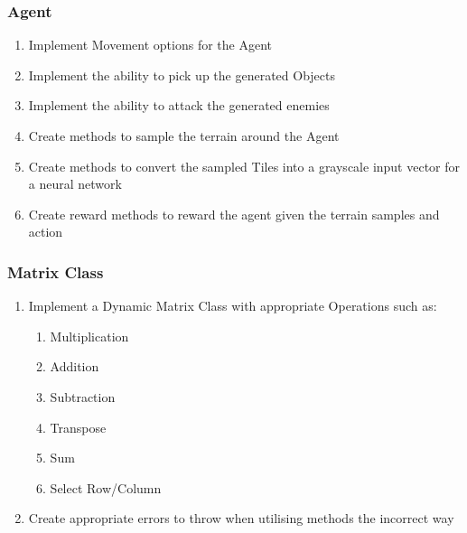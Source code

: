\begin{flushleft}
            \subsubsection*{Agent}
                \begin{enumerate}
                    \item Implement Movement options for the Agent
                    \item Implement the ability to pick up the generated Objects
                    \item Implement the ability to attack the generated enemies
                    \item Create methods to sample the terrain around the Agent
                    \item Create methods to convert the sampled Tiles into a grayscale input vector for a neural network
                    \item Create reward methods to reward the agent given the terrain samples and action
                \end{enumerate}   
            \subsubsection*{Matrix Class}
                \begin{enumerate}
                    \item Implement a Dynamic Matrix Class with appropriate Operations such as:
                        \begin{enumerate}
                            \item Multiplication
                            \item Addition
                            \item Subtraction
                            \item Transpose
                            \item Sum
                            \item Select Row/Column
                        \end{enumerate}
                    \item Create appropriate errors to throw when utilising methods the incorrect way
                \end{enumerate}   

\end{flushleft}

